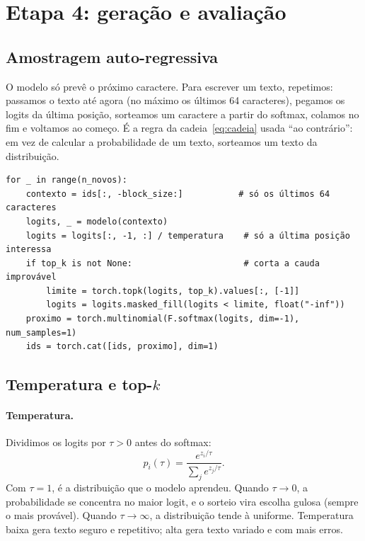 \documentclass[11pt,a4paper]{article}
\begin{document}
\section{Etapa 4: geração e avaliação}
\label{sec:geracao}

\subsection{Amostragem auto-regressiva}

O modelo só prevê o próximo caractere. Para escrever um texto, repetimos: passamos o texto até agora (no máximo os últimos 64 caracteres), pegamos os logits da última posição, sorteamos um caractere a partir do softmax, colamos no fim e voltamos ao começo. É a regra da cadeia~\eqref{eq:cadeia} usada ``ao contrário'': em vez de calcular a probabilidade de um texto, sorteamos um texto da distribuição.

\begin{lstlisting}
for _ in range(n_novos):
    contexto = ids[:, -block_size:]           # só os últimos 64 caracteres
    logits, _ = modelo(contexto)
    logits = logits[:, -1, :] / temperatura    # só a última posição interessa
    if top_k is not None:                      # corta a cauda improvável
        limite = torch.topk(logits, top_k).values[:, [-1]]
        logits = logits.masked_fill(logits < limite, float("-inf"))
    proximo = torch.multinomial(F.softmax(logits, dim=-1), num_samples=1)
    ids = torch.cat([ids, proximo], dim=1)
\end{lstlisting}

\subsection{Temperatura e top-$k$}

\paragraph{Temperatura.} Dividimos os logits por $\tau > 0$ antes do softmax:
\begin{equation}
p_i(\tau) = \frac{e^{z_i/\tau}}{\sum_j e^{z_j/\tau}}.
\end{equation}
Com $\tau=1$, é a distribuição que o modelo aprendeu. Quando $\tau \to 0$, a probabilidade se concentra no maior logit, e o sorteio vira escolha gulosa (sempre o mais provável). Quando $\tau \to \infty$, a distribuição tende à uniforme. Temperatura baixa gera texto seguro e repetitivo; alta gera texto variado e com mais erros.
\end{document}
